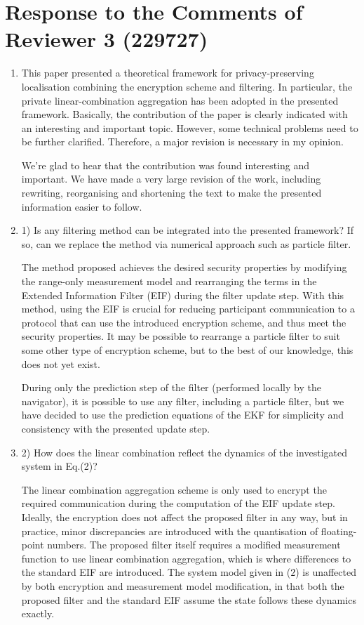 \documentclass[a4paper]{scrartcl}
\newenvironment{rebuttal}{\begin{enumerate}[label={\color{grey}\thesection.\arabic{enumi}},leftmargin=0pt,ref=\thesection.\arabic{enumi}]}{\end{enumerate}}
\newcommand{\reviewtext}[1]{{\color{nblue} #1}}
\begin{document}
\section*{Response to the Comments of Reviewer 3 (229727)}
\def\thesection{R3}
\begin{rebuttal}
\item \reviewtext{This paper presented a theoretical framework for privacy-preserving localisation combining the encryption scheme and filtering. In particular, the private linear-combination aggregation has been adopted in the presented framework. Basically, the contribution of the paper is clearly indicated with an interesting and important topic. However, some technical problems need to be further clarified. Therefore, a major revision is necessary in my opinion.}

We're glad to hear that the contribution was found interesting and important. We have made a very large revision of the work, including rewriting, reorganising and shortening the text to make the presented information easier to follow.

\item \reviewtext{1) Is any filtering method can be integrated into the presented framework? If so, can we replace the method via numerical approach such as particle filter.}

The method proposed achieves the desired security properties by modifying the range-only measurement model and rearranging the terms in the Extended Information Filter (EIF) during the filter update step. With this method, using the EIF is crucial for reducing participant communication to a protocol that can use the introduced encryption scheme, and thus meet the security properties. It may be possible to rearrange a particle filter to suit some other type of encryption scheme, but to the best of our knowledge, this does not yet exist.

During only the prediction step of the filter (performed locally by the navigator), it is possible to use any filter, including a particle filter, but we have decided to use the prediction equations of the EKF for simplicity and consistency with the presented update step.

\item \reviewtext{2) How does the linear combination reflect the dynamics of the investigated system in Eq.(2)?}
  
The linear combination aggregation scheme is only used to encrypt the required communication during the computation of the EIF update step. Ideally, the encryption does not affect the proposed filter in any way, but in practice, minor discrepancies are introduced with the quantisation of floating-point numbers. The proposed filter itself requires a modified measurement function to use linear combination aggregation, which is where differences to the standard EIF are introduced. The system model given in ($2$) is unaffected by both encryption and measurement model modification, in that both the proposed filter and the standard EIF assume the state follows these dynamics exactly.


\end{rebuttal}
\end{document}
